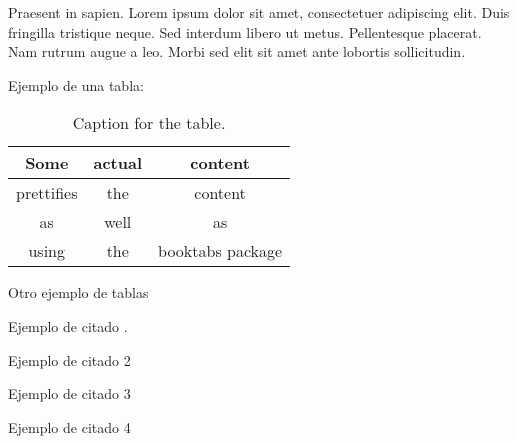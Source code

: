 Praesent in sapien. Lorem ipsum dolor sit amet, consectetuer adipiscing 
elit. Duis fringilla tristique neque. Sed interdum libero ut metus. 
Pellentesque placerat. Nam rutrum augue a leo. Morbi sed elit sit amet 
ante lobortis sollicitudin.

Ejemplo de una tabla:

\begin{table}[h!]
	\centering
	\caption{Caption for the table.}
	\label{tab:table1}
	\begin{tabular}{ccc}
		\toprule
		Some & actual & content\\
		\midrule
		prettifies & the & content\\
		as & well & as\\
		using & the & booktabs package\\
		\bottomrule
	\end{tabular}
\end{table}

Otro ejemplo de tablas



Ejemplo de citado \cite{Vickrey1961}.

Ejemplo de citado 2 

Ejemplo de citado 3 \cite{baggio}

Ejemplo de citado 4 



